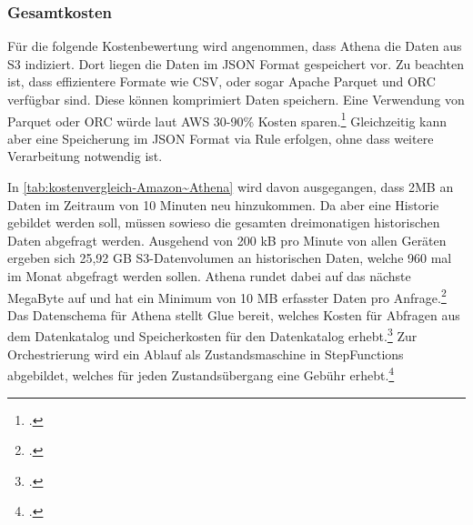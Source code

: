 \subsubsection{Gesamtkosten}
Für die folgende Kostenbewertung wird angenommen, dass Athena die Daten aus \ac{S3} indiziert. Dort liegen die Daten im \ac{JSON} Format gespeichert vor. Zu beachten ist, dass effizientere Formate wie CSV, oder sogar Apache Parquet und ORC verfügbar sind. Diese können komprimiert Daten speichern. Eine Verwendung von Parquet oder ORC würde laut \ac{AWS} 30-90\% Kosten sparen.\footcite[Vgl.][]{AmazonWebServicesInc..o.J.t} Gleichzeitig kann aber eine Speicherung im \ac{JSON} Format via \AWSIOT{} Rule erfolgen, ohne dass weitere Verarbeitung notwendig ist.


In \autoref{tab:kostenvergleich-Amazon~Athena} wird davon ausgegangen, dass 2MB an Daten im Zeitraum von 10 Minuten neu hinzukommen. Da aber eine Historie gebildet werden soll, müssen sowieso die gesamten dreimonatigen historischen Daten abgefragt werden. Ausgehend von 200 kB pro Minute von allen Geräten ergeben sich 25,92 GB \ac{S3}-Datenvolumen an historischen Daten, welche 960 mal im Monat abgefragt werden sollen. Athena rundet dabei auf das nächste MegaByte auf und hat ein Minimum von 10 MB erfasster Daten pro Anfrage.\footcite[Vgl.][]{AmazonWebServicesInc..o.J.t} Das Datenschema für Athena stellt Glue bereit, welches Kosten für Abfragen aus dem Datenkatalog und Speicherkosten für den Datenkatalog erhebt.\footcite[Vgl.][]{AmazonWebServicesInc..o.J.u} Zur Orchestrierung wird ein Ablauf als Zustandsmaschine in StepFunctions abgebildet, welches für jeden Zustandsübergang eine Gebühr erhebt.\footcite[Vgl.][]{AmazonWebServicesInc..o.J.v}

